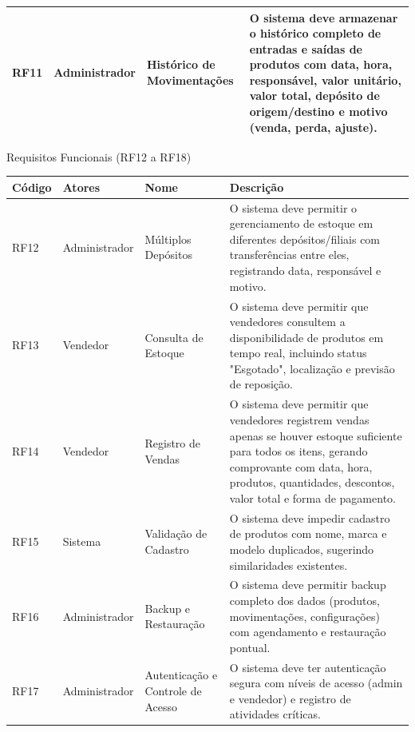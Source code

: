 \documentclass[
	12pt,				%
	openany,			%
	twoside,			%
	a4paper,			%
	english,			%
	brazil				%
	]{abntex2}
\begin{document}
\begin{quadro}[htb]
\begin{tabular}{|p{1.4cm}|p{2.8cm}|p{4.5cm}|p{7.0cm}|}
    RF11 & Administrador & Histórico de Movimentações & O sistema deve armazenar o histórico completo de entradas e saídas de produtos com data, hora, responsável, valor unitário, valor total, depósito de origem/destino e motivo (venda, perda, ajuste). \\ \hline

    

    

\end{tabular}
\end{quadro}

\FloatBarrier

\begin{quadro}[htb]
\caption{\label{quadro_rf3}Requisitos Funcionais (RF12 a RF18)}
\hspace*{-1cm}
\begin{tabular}{|p{1.4cm}|p{2.8cm}|p{4.5cm}|p{7.0cm}|}
    \hline
    \textbf{Código} & \textbf{Atores} & \textbf{Nome} & \textbf{Descrição} \\ \hline

    RF12 & Administrador & Múltiplos Depósitos & O sistema deve permitir o gerenciamento de estoque em diferentes depósitos/filiais com transferências entre eles, registrando data, responsável e motivo. \\ \hline

    RF13 & Vendedor & Consulta de Estoque & O sistema deve permitir que vendedores consultem a disponibilidade de produtos em tempo real, incluindo status "Esgotado", localização e previsão de reposição. \\ \hline

    RF14 & Vendedor & Registro de Vendas & O sistema deve permitir que vendedores registrem vendas apenas se houver estoque suficiente para todos os itens, gerando comprovante com data, hora, produtos, quantidades, descontos, valor total e forma de pagamento. \\ \hline

    RF15 & Sistema & Validação de Cadastro & O sistema deve impedir cadastro de produtos com nome, marca e modelo duplicados, sugerindo similaridades existentes. \\ \hline

    RF16 & Administrador & Backup e Restauração & O sistema deve permitir backup completo dos dados (produtos, movimentações, configurações) com agendamento e restauração pontual. \\ \hline

    RF17 & Administrador & Autenticação e Controle de Acesso & O sistema deve ter autenticação segura com níveis de acesso (admin e vendedor) e registro de atividades críticas. \\ \hline


\end{tabular}
\end{quadro}
\end{document}
